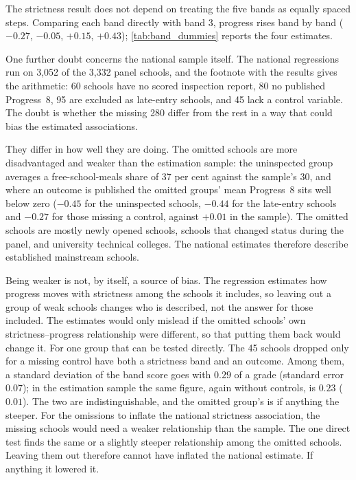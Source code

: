 The strictness result does not depend on treating the five bands as equally spaced steps. Comparing each band directly with band 3, progress rises band by band ($-0.27$, $-0.05$, $+0.15$, $+0.43$); \cref{tab:band_dummies} reports the four estimates.

One further doubt concerns the national sample itself. The national regressions run on 3,052 of the 3,332 panel schools, and the footnote with the results gives the arithmetic: 60 schools have no scored inspection report, 80 no published Progress~8, 95 are excluded as late-entry schools, and 45 lack a control variable. The doubt is whether the missing 280 differ from the rest in a way that could bias the estimated associations.

They differ in how well they are doing. The omitted schools are more disadvantaged and weaker than the estimation sample: the uninspected group averages a free-school-meals share of 37 per cent against the sample's 30, and where an outcome is published the omitted groups' mean Progress~8 sits well below zero ($-0.45$ for the uninspected schools, $-0.44$ for the late-entry schools and $-0.27$ for those missing a control, against $+0.01$ in the sample). The omitted schools are mostly newly opened schools, schools that changed status during the panel, and university technical colleges. The national estimates therefore describe established mainstream schools.

Being weaker is not, by itself, a source of bias. The regression estimates how progress moves with strictness among the schools it includes, so leaving out a group of weak schools changes who is described, not the answer for those included. The estimates would only mislead if the omitted schools' own strictness--progress relationship were different, so that putting them back would change it. For one group that can be tested directly. The 45 schools dropped only for a missing control have both a strictness band and an outcome. Among them, a standard deviation of the band score goes with $0.29$ of a grade (standard error $0.07$); in the estimation sample the same figure, again without controls, is $0.23$ ($0.01$). The two are indistinguishable, and the omitted group's is if anything the steeper. For the omissions to inflate the national strictness association, the missing schools would need a weaker relationship than the sample. The one direct test finds the same or a slightly steeper relationship among the omitted schools. Leaving them out therefore cannot have inflated the national estimate. If anything it lowered it.

